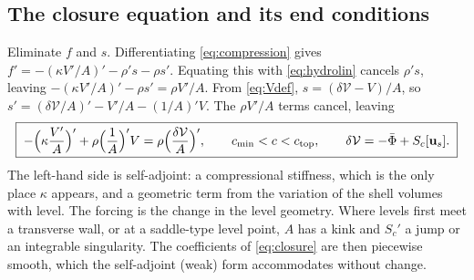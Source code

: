 \documentclass[11pt]{article}
\theoremstyle{definition}
\theoremstyle{remark}
\newcommand{\bu}{\mathbf{u}}
\newcommand{\Vol}{\mathcal V}
\begin{document}
\subsection{The closure equation and its end conditions}
\label{sec:closuresec}
\label{sec:closure}

Eliminate $f$ and $s$. Differentiating \eqref{eq:compression} gives $f'
= -(\kappa V'/A)' - \rho's - \rho s'$. Equating this with
\eqref{eq:hydrolin} cancels $\rho's$, leaving $-(\kappa V'/A)' - \rho s'
= \rho V'/A$. From \eqref{eq:Vdef}, $s = (\delta\Vol - V)/A$, so $s' =
(\delta\Vol/A)' - V'/A - (1/A)'V$. The $\rho V'/A$ terms cancel,
leaving
\begin{equation}
  \boxed{\;-\Bigl(\kappa\frac{V'}{A}\Bigr)' + \rho\Bigl(\frac1A\Bigr)'V
  = \rho\Bigl(\frac{\delta\Vol}{A}\Bigr)',\qquad
  c_{\min} < c < c_{\mathrm{top}},\qquad
  \delta\Vol = -\bar\Phi + S_c[\bu_s].\;}
  \label{eq:closure}
\end{equation}
The left-hand side is self-adjoint: a compressional stiffness, which is
the only place $\kappa$ appears, and a geometric term from the
variation of the shell volumes with level. The forcing is the change in
the level geometry. Where levels first meet a transverse wall, or at a
saddle-type level point, $A$ has a kink and $S_c'$ a jump or an
integrable singularity. The coefficients of \eqref{eq:closure} are then
piecewise smooth, which the self-adjoint (weak) form accommodates
without change.
\end{document}
